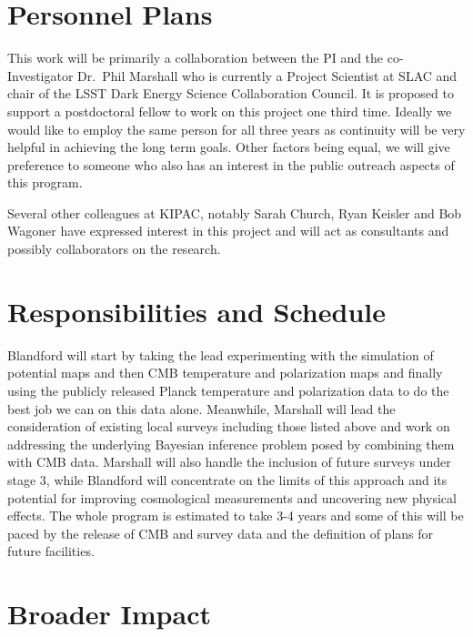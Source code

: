 \documentclass[psfig,11pt]{article}
\begin{document}
{\section{Personnel Plans}

This work will be primarily a collaboration between the PI and the co-Investigator Dr.\ Phil Marshall who is currently a Project Scientist at SLAC and chair of the LSST Dark Energy Science Collaboration Council. It is proposed to support a postdoctoral fellow to work on this project one third time. Ideally we would like to employ the same person for all three years as continuity will be very helpful in achieving the long term goals. Other factors being equal, we will give preference to someone who also has an interest in the public outreach aspects of this program.

Several other colleagues at KIPAC, notably Sarah Church, Ryan Keisler and Bob Wagoner have expressed interest in this project and will act as consultants and possibly collaborators on the research.


\section{Responsibilities and Schedule}

Blandford will start by taking the lead experimenting with the simulation of potential maps and then CMB temperature and polarization maps and finally using the publicly released Planck temperature and polarization data to do the best job we can on this data alone. Meanwhile, Marshall will lead the consideration of existing local surveys including those listed above and work on addressing the underlying Bayesian inference problem posed by combining them with CMB data. Marshall will also handle the inclusion of future surveys under stage 3, while Blandford will concentrate on the limits of this approach and its potential for improving cosmological measurements and uncovering new physical effects. The whole program is estimated to take 3-4 years and some of this will be paced by the release of CMB and survey data and the definition of plans for future facilities.


\section{Broader Impact}

}
\end{document}
